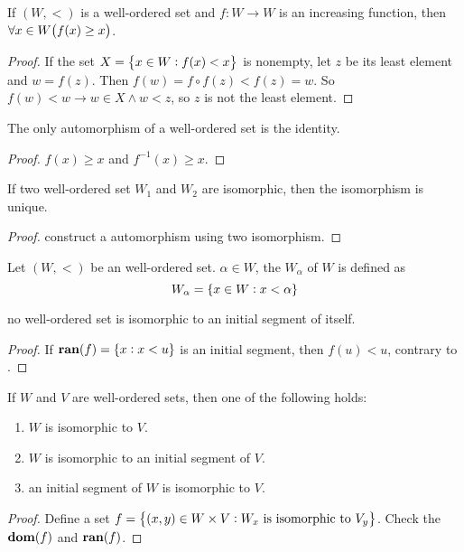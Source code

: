 \begin{theorem}\label{wellorderedsetisomorphismisbigger}
    If $(W,<)$ is a well-ordered set and $f:W \rightarrow W$ is an increasing function, then $\forall x\in W \mleft( f(x) \geq x \mright)$.
\end{theorem}
\begin{proof}
    If the set $X = \set{x \in W: f(x) < x}$ is nonempty, let $z$ be its least element and $w = f(z)$. Then $f(w) = f \circ f(z) < f(z) = w $. So $f(w) < w \rightarrow w \in X \wedge w < z$, so $z$ is not the least element.
\end{proof}

\begin{theorem}
    The only automorphism of a well-ordered set is the identity.    
\end{theorem}
\begin{proof}
    $f(x) \geq x$ and $f^{-1} (x) \geq x$.
\end{proof}


\begin{theorem}
    If two well-ordered set $W_1$ and $W_2$ are isomorphic, then the isomorphism is unique.
\end{theorem}
\begin{proof}
    construct a automorphism using two isomorphism.
\end{proof}

\begin{definition}
    Let $(W,<)$ be an well-ordered set. $\alpha \in W$, the  $W_\alpha$ of $W$ is defined as
    \begin{equation}
        W_\alpha = \set{x \in W: x < \alpha}
    \end{equation}
\end{definition}

\begin{theorem}
    no well-ordered set is isomorphic to an initial segment of itself.    
\end{theorem}
\begin{proof}
    If $\mathbf{ran}(f) = \set{x: x < u}$ is an initial segment, then $f(u) < u$, contrary to .
\end{proof}

\begin{theorem}
    If $W$ and $V$ are well-ordered sets, then one of the following holds:
    \begin{enumerate}
        \item $W$ is isomorphic to $V$.
        \item $W$ is isomorphic to an initial segment of $V$.
        \item an initial segment of $W$ is isomorphic to $V$.
    \end{enumerate}    
\end{theorem}
\begin{proof}
    Define a set $f = \set{(x,y)\in W \times V: W_x \text{ is isomorphic to } V_y}$. Check the $\mathbf{dom}(f)$ and $\mathbf{ran}(f)$.
\end{proof}





